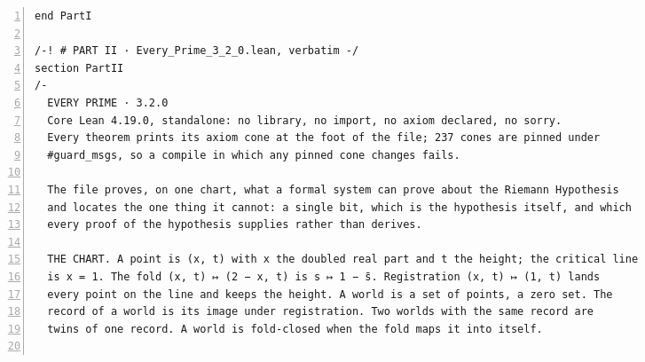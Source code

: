 \documentclass[10pt]{article}
\newcommand{\leansize}{\fontsize{5.5pt}{6.75pt}\selectfont}
\begin{document}
\begin{multicols}{2}
\begin{Verbatim}[numbers=left,firstnumber=1,numbersep=3pt,xleftmargin=2.6em,breaklines=true,breakanywhere=true,breakautoindent=false,breakindent=1.4em,breaksymbolleft={},breakanywheresymbolpre={},fontsize=\leansize]
end PartI

/-! # PART II · Every_Prime_3_2_0.lean, verbatim -/
section PartII
/-
  EVERY PRIME · 3.2.0
  Core Lean 4.19.0, standalone: no library, no import, no axiom declared, no sorry.
  Every theorem prints its axiom cone at the foot of the file; 237 cones are pinned under
  #guard_msgs, so a compile in which any pinned cone changes fails.

  The file proves, on one chart, what a formal system can prove about the Riemann Hypothesis
  and locates the one thing it cannot: a single bit, which is the hypothesis itself, and which
  every proof of the hypothesis supplies rather than derives.

  THE CHART. A point is (x, t) with x the doubled real part and t the height; the critical line
  is x = 1. The fold (x, t) ↦ (2 − x, t) is s ↦ 1 − s̄. Registration (x, t) ↦ (1, t) lands
  every point on the line and keeps the height. A world is a set of points, a zero set. The
  record of a world is its image under registration. Two worlds with the same record are
  twins of one record. A world is fold-closed when the fold maps it into itself.


\end{Verbatim}
\end{multicols}
\end{document}
